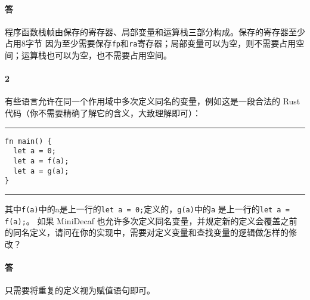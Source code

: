 \documentclass[UTF8]{ctexart}
\newcommand{\T}[1]{\texttt{{#1}}}
\begin{document}
        \paragraph{答} 程序函数栈帧由保存的寄存器、局部变量和运算栈三部分构成。保存的寄存器至少占用8字节
        因为至少需要保存\T{fp}和\T{ra}寄存器；局部变量可以为空，则不需要占用空间；运算栈也可以为空，也不需要占用空间。
        \paragraph{2} 有些语言允许在同一个作用域中多次定义同名的变量，例如这是一段合法的 Rust 代码（你不需要精确了解它的含义，大致理解即可）：
        
        \noindent\rule{\textwidth}{1pt}
        \begin{lstlisting}[style=lfonts]
fn main() {
  let a = 0;
  let a = f(a);
  let a = g(a);
}
        \end{lstlisting}
        \noindent\rule{\textwidth}{1pt}
        
        其中\T{f(a)}中的a是上一行的\T{let a = 0;}定义的，\T{g(a)}中的\T{a}
        是上一行的\T{let a = f(a);}。
        如果 MiniDecaf 也允许多次定义同名变量，并规定新的定义会覆盖之前的同名定义，请问在你的实现中，需要对定义变量和查找变量的逻辑做怎样的修改？
        \paragraph{答} 只需要将重复的定义视为赋值语句即可。
\end{document}
